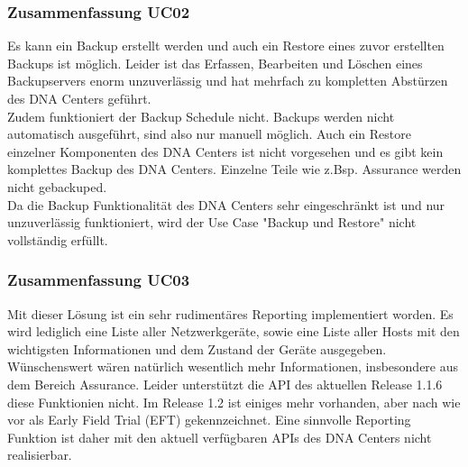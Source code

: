 \begin{landscape}
\subsubsection{Zusammenfassung UC02}
Es kann ein Backup erstellt werden und auch ein Restore eines zuvor erstellten Backups ist möglich. Leider ist das Erfassen, Bearbeiten und Löschen eines Backupservers enorm unzuverlässig und hat mehrfach zu kompletten Abstürzen des DNA Centers geführt. \\
Zudem funktioniert der Backup Schedule nicht. Backups werden nicht automatisch ausgeführt, sind also nur manuell möglich. Auch ein Restore einzelner Komponenten des DNA Centers ist nicht vorgesehen und es gibt kein komplettes Backup des DNA Centers. Einzelne Teile wie z.Bsp. Assurance werden nicht gebackuped. \\
Da die Backup Funktionalität des DNA Centers sehr eingeschränkt ist und nur unzuverlässig funktioniert, wird der Use Case "Backup und Restore" nicht vollständig erfüllt.
\pagebreak


\subsubsection{Zusammenfassung UC03}
Mit dieser Lösung ist ein sehr rudimentäres Reporting implementiert worden. Es wird lediglich eine Liste aller Netzwerkgeräte, sowie eine Liste aller Hosts mit den wichtigsten Informationen und dem Zustand der Geräte ausgegeben. Wünschenswert wären natürlich wesentlich mehr Informationen, insbesondere aus dem Bereich Assurance. Leider unterstützt die API des aktuellen Release 1.1.6 diese Funktionien nicht. Im Release 1.2 ist einiges mehr vorhanden, aber nach wie vor als Early Field Trial (EFT) gekennzeichnet. 
Eine sinnvolle Reporting Funktion ist daher mit den aktuell verfügbaren APIs des DNA Centers nicht realisierbar.



\end{landscape}
